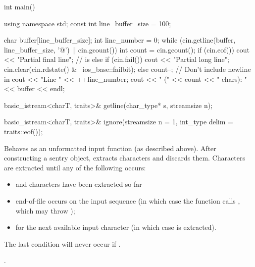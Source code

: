\begin{itemdescr}
\begin{example}
\begin{codeblock}
int main() {
  using namespace std;
  const int line_buffer_size = 100;

  char buffer[line_buffer_size];
  int line_number = 0;
  while (cin.getline(buffer, line_buffer_size, '@\textbackslash@n') || cin.gcount()) {
    int count = cin.gcount();
    if (cin.eof())
      cout << "Partial final line";     //  is 
    else if (cin.fail()) {
      cout << "Partial long line";
      cin.clear(cin.rdstate() & ~ios_base::failbit);
    } else {
      count--;                          // Don't include newline in 
      cout << "Line " << ++line_number;
    }
    cout << " (" << count << " chars): " << buffer << endl;
  }
}
\end{codeblock}
\end{example}
\end{itemdescr}

%
\begin{itemdecl}
basic_istream<charT, traits>& getline(char_type* s, streamsize n);
\end{itemdecl}

\begin{itemdescr}
\pnum
\returns
{}
\end{itemdescr}

%
\begin{itemdecl}
basic_istream<charT, traits>& ignore(streamsize n = 1, int_type delim = traits::eof());
\end{itemdecl}

\begin{itemdescr}
\pnum
\effects
Behaves as an unformatted input function
(as described above).
After constructing a sentry object, extracts
characters and discards them.
Characters are extracted until any of the following occurs:
\begin{itemize}
\item
{}
and
 characters have been extracted so far
\item
end-of-file occurs on the input sequence
(in which case the function calls
,
which may throw
);
\item
{}
for the next available input character 
(in which case  is extracted).
\end{itemize}
\begin{note}
The last condition will never occur if
.
\end{note}

\pnum
\returns
{}.
\end{itemdescr}

